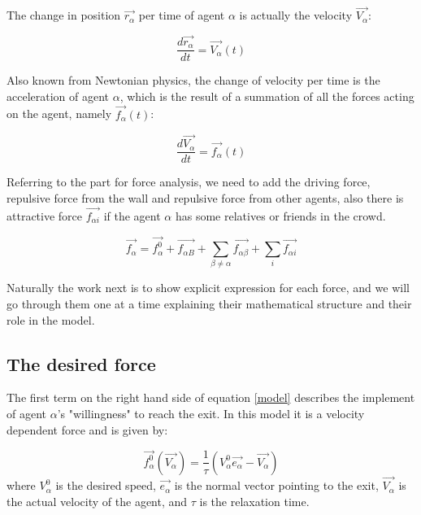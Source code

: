The change in position $ \vec{r_{\alpha}} $ per time of 
agent $\alpha$ is actually the velocity $ \vec{V_{\alpha}} $:

\begin{equation}
		\frac{d \vec{r_{\alpha}}}{dt} = \vec{V_{\alpha}} \left( t \right)
\end{equation}

Also known from Newtonian physics, the change of velocity per time is the acceleration of agent 
$\alpha$, which is the result of a summation of all the forces acting on the agent, namely 
$\vec{f_{\alpha}} \left( t \right)$:

\begin{equation}
    \frac{d \vec{V_{\alpha}}}{dt} = \vec{f_{\alpha}} \left( t \right) 
\end{equation}

Referring to the part for force analysis, we need to add the driving force, repulsive force from 
the wall and repulsive force from other agents, also there is attractive force $\vec{f_{\alpha i}}$ 
if the agent $ \alpha $ has some relatives or friends in the crowd.

\begin{equation}\label{model}
    \vec{f_{\alpha}} = \vec{f^{0}_{\alpha}} + \vec{f_{\alpha B}} +
    \sum_{\beta \neq \alpha} \vec{f_{\alpha \beta}} +  
    \sum_{i} \vec{f_{\alpha i}} 
\end{equation}

Naturally the work next is to show explicit expression for each force, and we will go 
through them one at a time explaining their mathematical structure and their role in the model.

\subsection{The desired force} %
The first term on the right hand side of equation \eqref{model} describes the implement of agent 
$ \alpha $'s "willingness" to reach the exit. In this model it is a velocity dependent force 
and is given by:

\begin{equation}\label{relaxtime}
	\vec{f^{0}_{\alpha}}\left( \vec{V_{\alpha}} \right) =
    \frac{1}{\tau}
    \left( V_{\alpha}^{0} \vec{e_{\alpha}} - \vec{V_{\alpha}} \right)
\end{equation}
where $V_{\alpha}^{0}$ is the desired speed, $ \vec{e_{\alpha}} $ is the normal vector pointing 
to the exit, $\vec{V_{\alpha}}$ is the actual velocity of the agent, and $\tau$ is the relaxation time.


